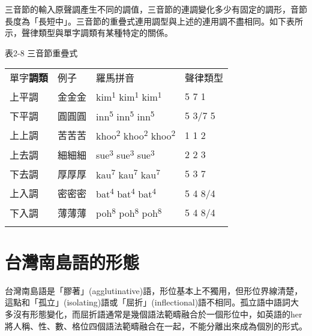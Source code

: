 \textrm{三音節的輸入原聲調產生不同的調值，三音節的連調變化多少有固定的調形，音節長度為「長短中」。三音節的重疊式連用調型與上述的連用調不盡相同。如下表所示，聲律類型與單字調類有某種特定的關係。}

\rmfamily
表2-8 三音節重疊式

\tablefirsthead{}

\tabletail{}
\tablelasttail{}
\begin{tabularx}{\textwidth}{XXXX}
\lsptoprule

{\sffamily \textrm{單字}\textrm{\textbf{調類}}} & 例子 & 羅馬拼音 & 聲律類型\\
 上平調 & 金金金 & {\sffamily \textrm{kim}\textrm{\textsuperscript{1} }\textrm{kim}\textrm{\textsuperscript{1}} \textrm{kim}\textrm{\textsuperscript{1}}} & 5 7 1\\
 下平調 & 圓圓圓 & {\sffamily \textrm{inn}\textrm{\textsuperscript{5}} \textrm{inn}\textrm{\textsuperscript{5}} \textrm{inn}\textrm{\textsuperscript{5}}} & 5 3/7 5\\
 上上調 & 苦苦苦 & {\sffamily \textrm{khoo}\textrm{\textsuperscript{2}} \textrm{khoo}\textrm{\textsuperscript{2}} \textrm{khoo}\textrm{\textsuperscript{2}}} & 1 1 2\\
 上去調 & 細細細 & {\sffamily \textrm{sue}\textrm{\textsuperscript{3}} \textrm{sue}\textrm{\textsuperscript{3}} \textrm{sue}\textrm{\textsuperscript{3}}} & 2 2 3\\
 下去調 & 厚厚厚 & {\sffamily \textrm{kau}\textrm{\textsuperscript{7}} \textrm{kau}\textrm{\textsuperscript{7}} \textrm{kau}\textrm{\textsuperscript{7}}} & 5 3 7\\
 上入調 & 密密密 & {\sffamily \textrm{bat}\textrm{\textsuperscript{4}} \textrm{bat}\textrm{\textsuperscript{4}} \textrm{bat}\textrm{\textsuperscript{4}}} & 5 4 8/4\\
 下入調 & 薄薄薄 & {\sffamily \textrm{poh}\textrm{\textsuperscript{8}} \textrm{poh}\textrm{\textsuperscript{8}} \textrm{poh}\textrm{\textsuperscript{8}}} & 5 4 8/4\\
\lspbottomrule
\end{tabularx}
\section{\textrm{台灣南島語的形態}}
\begin{styleii}
台灣南島語是「膠著」(agglutinative)語\textsf{，}形位基本上不獨用\textsf{，}但形位界線清楚\textsf{，}這點和「孤立」(isolating)語或「屈折」(inflectional)語不相同\textsf{。}孤立語中語詞大多沒有形態變化\textsf{，}而屈折語通常是幾個語法範疇融合於一個形位中\textsf{，}如英語的her將人稱\textsf{、}性\textsf{、}數\textsf{、}格位四個語法範疇融合在一起\textsf{，}不能分離出來成為個別的形式\textsf{。}
\end{styleii}

